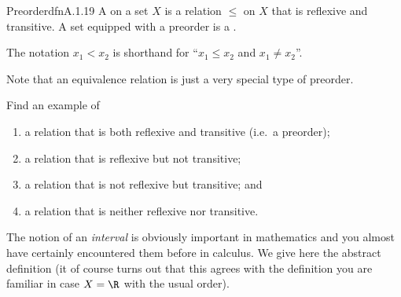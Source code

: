 \begin{dfn}{Preorder}{dfnA.1.19}
A  on a set $X$ is a relation $\leq$ on $X$ that is reflexive and transitive.  A set equipped with a preorder is a .
\begin{rmk}
The notation $x_1<x_2$ is shorthand for ``$x_1\leq x_2$ and $x_1\neq x_2$''.
\end{rmk}
\begin{rmk}
Note that an equivalence relation is just a very special type of preorder.
\end{rmk}
\end{dfn}
\begin{exr}{}{}
Find an example of
\begin{enumerate}
\item a relation that is both reflexive and transitive (i.e.~a preorder);
\item a relation that is reflexive but not transitive;
\item a relation that is not reflexive but transitive; and
\item a relation that is neither reflexive nor transitive.
\end{enumerate}
\end{exr}
The notion of an \emph{interval} is obviously important in mathematics and you almost have certainly encountered them before in calculus.  We give here the abstract definition (it of course turns out that this agrees with the definition you are familiar in case $X=\R$ with the usual order).
